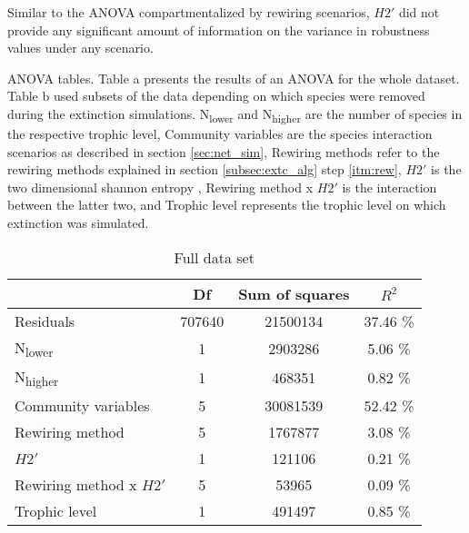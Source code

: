 \documentclass[12pt,a4paper]{article}
\begin{document}
Similar to the ANOVA compartmentalized by rewiring scenarios, $H2'$ did not provide any significant amount of information on the variance in robustness values under any scenario.

\begin{table}[H]
\centering
\captionsetup{width = \linewidth}
\caption{ANOVA tables. Table a presents the results of an ANOVA for the whole dataset. Table b used subsets of the data depending on which species were removed during the extinction simulations. N\textsubscript{lower} and N\textsubscript{higher} are the number of species in the respective trophic level, Community variables are the species interaction scenarios as described in section \ref{sec:net_sim}, Rewiring methods refer to the rewiring methods explained in section \ref{subsec:extc_alg} step \ref{itm:rew}, $H2'$ is the two dimensional shannon entropy \parencite{Bluethgen2006}, Rewiring method x $H2'$ is the interaction between the latter two, and Trophic level represents the trophic level on which extinction was simulated.}
\begin{subtable}{\linewidth}
\caption{Full data set}
\label{tab:anova_full}
\begin{tabularx}{\linewidth}{@{} X *3{c} @{}}
\toprule
  						& Df 	& Sum of squares	& $R^2$ 		\\ \midrule
Residuals 				& 707640	& 21500134 		& 37.46 \% 	\\ 
N\textsubscript{lower} 	& 1 		& 2903286 		& 5.06 \% 	\\
N\textsubscript{higher} 	& 1 		& 468351 		& 0.82 \% 	\\
Community variables 		& 5 		& 30081539 		& 52.42 \% 	\\
Rewiring method 			& 5 		& 1767877 		& 3.08 \% 	\\ 
$H2'$ 					& 1 		& 121106			& 0.21 \% 	\\
Rewiring method x $H2'$ 	& 5 		& 53965 			& 0.09 \% 	\\ 
Trophic level 			& 1 		& 491497 		& 0.85 \%  \\ \bottomrule
\end{tabularx}
\end{subtable}
\medskip



\end{table}
\end{document}
